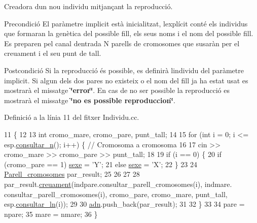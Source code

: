 Creadora d\textquotesingle{}un nou individu mitjançant la reproducció. 

\begin{DoxyPrecond}{Precondició}
El paràmetre implicit està inicialitzat, l\textquotesingle{}explícit conté els individus que formaran la genètica del possible fill, els seus noms i el nom del possible fill. Es preparen pel canal d\textquotesingle{}entrada N parells de cromosomes que s\textquotesingle{}usaràn per el creuament i el seu punt de tall. 
\end{DoxyPrecond}
\begin{DoxyPostcond}{Postcondició}
Si la reproducció és possible, es definirà l\textquotesingle{}individu del paràmetre implicit. Si algun dels dos pares no existeix o el nom del fill ja ha estat usat es mostrarà el missatge {\bfseries \char`\"{}error\char`\"{}}. En cas de no ser possible la reproducció es mostrarà el missatge {\bfseries \char`\"{}no es possible reproduccion\char`\"{}}. 
\end{DoxyPostcond}


Definició a la línia 11 del fitxer Individu.\+cc.


\begin{DoxyCode}
11                                                                                                           \{
12     
13         \textcolor{keywordtype}{int} cromo\_mare, cromo\_pare, punt\_tall;
14         
15         \textcolor{keywordflow}{for} (\textcolor{keywordtype}{int} i = 0; i <= esp.\hyperlink{class_especie_ab8a394dfdea959e383645ae90d0086ca}{consultar\_n}(); i++) \{ \textcolor{comment}{// Cromosoma a cromosoma}
16   
17             cin >> cromo\_mare >> cromo\_pare >> punt\_tall;
18             
19             \textcolor{keywordflow}{if} (i == 0) \{
20                 \textcolor{keywordflow}{if} (cromo\_pare == 1) \hyperlink{class_individu_a978281da58a84f7e4b8f3b9645cc6ec1}{sexe} = \textcolor{charliteral}{'Y'};
21                 \textcolor{keywordflow}{else} \hyperlink{class_individu_a978281da58a84f7e4b8f3b9645cc6ec1}{sexe} = \textcolor{charliteral}{'X'};
22             \}
23             
24             \hyperlink{class_parell__cromosomes}{Parell\_cromosomes} par\_result;
25             
26       
27             
28             par\_result.\hyperlink{class_parell__cromosomes_a4be1f5db491e742fa2ced6a22442c0a2}{creuament}(indpare.consultar\_parell\_cromosomes(i), indmare.
      consultar\_parell\_cromosomes(i), cromo\_pare, cromo\_mare, punt\_tall, esp.\hyperlink{class_especie_aaa23d14e7e07335ff033d31e89e359ec}{consultar\_ln}(i));
29             
30             \hyperlink{class_individu_a9e3ff2f5573b349ddb98dff46b11e143}{adn}.push\_back(par\_result);
31         
32     \}
33 
34     pare = npare;
35     mare = nmare;
36 \}
\end{DoxyCode}
